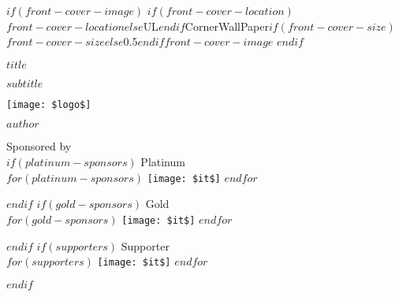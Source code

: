 

\begin{titlepage}
$if(front-cover-image)$
\This$if(front-cover-location)$$front-cover-location$$else$UL$endif$CornerWallPaper{$if(front-cover-size)$$front-cover-size$$else$0.5$endif$}{$front-cover-image$}
$endif$

\centering
\vspace{4\baselineskip}
{\bfseries\fontsize{50}{50}\selectfont $title$ \par}
\vspace{3\baselineskip}
{\Large $subtitle$ \par}
\texttt{[image: \$logo\$]}\\
{\large\textsc{$author$} \par}
\vspace{2\baselineskip}
{\large Sponsored by}\\[5mm]
\centering
$if(platinum-sponsors)$
Platinum\\[3mm]
$for(platinum-sponsors)$
\texttt{[image: \$it\$]}
$endfor$
\par
$endif$
$if(gold-sponsors)$
Gold\\[3mm]
$for(gold-sponsors)$
\texttt{[image: \$it\$]}
$endfor$
\par
$endif$
$if(supporters)$
Supporter\\[3mm]
$for(supporters)$
\texttt{[image: \$it\$]}
$endfor$
\par
$endif$

\end{titlepage}

\newpage 

